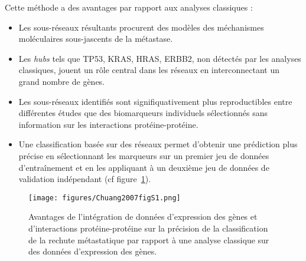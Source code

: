 			Cette méthode a des avantages par rapport aux analyses classiques :
			\begin{itemize}
				\item Les sous-réseaux résultants procurent des modèles des méchanismes moléculaires sous-jascents de la métastase.
				\item Les \emph{hubs} tels que \acs{TP53}, \acs{KRAS}, \acs{HRAS}, \acs{ERBB2}, non détectés par les analyses classiques, jouent un rôle central dans les réseaux en interconnectant un grand nombre de gènes.
				\item Les sous-réseaux identifiés sont signifiquativement plus reproductibles entre différentes études que des biomarqueurs individuels sélectionnés sans information sur les interactions protéine-protéine.
				\item Une classification basée sur des réseaux permet d'obtenir une prédiction plus précise en sélectionnant les marqueurs sur un premier jeu de données d'entraînement et en les appliquant à un deuxième jeu de données de validation indépendant (cf figure~\ref{fig:Chuang2007figS1}).
			\end{itemize}

			\begin{figure}
				\centering
				\texttt{[image: figures/Chuang2007figS1.png]}
				\caption{Avantages de l'intégration de données d'expression des gènes et d'interactions protéine-protéine sur la précision de la classification de la rechute métastatique par rapport à une analyse classique sur des données d'expression des gènes\citep{Chuang2007}.}
				\label{fig:Chuang2007figS1}
			\end{figure}

